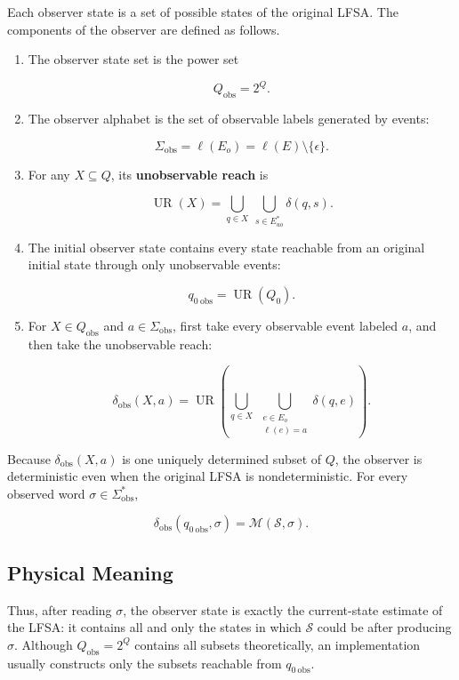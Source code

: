 \documentclass[11pt]{article}
\begin{document}
Each observer state is a set of possible states of the original LFSA. The components of the observer are defined as follows.

\begin{enumerate}
\item The observer state set is the power set

\[
   Q_{\mathrm{obs}}=2^Q.
\]

\item The observer alphabet is the set of observable labels generated by events:

\[
   \Sigma_{\mathrm{obs}}
   =\ell(E_o)
   =\ell(E)\setminus\{\epsilon\}.
\]

\item For any $X\subseteq Q$, its \textbf{unobservable reach} is

\[
   \operatorname{UR}(X)
   =\bigcup_{q\in X}\ \bigcup_{s\in E_{uo}^*}\delta(q,s).
\]

\item The initial observer state contains every state reachable from an original initial state through only unobservable events:

\[
   q_{0\ \mathrm{obs}}
   =\operatorname{UR}(Q_0).
\]

\item For $X\in Q_{\mathrm{obs}}$ and $a\in\Sigma_{\mathrm{obs}}$, first take every observable event labeled $a$, and then take the unobservable reach:

\[
   \delta_{\mathrm{obs}}(X,a)
   =
   \operatorname{UR}\left(
   \bigcup_{q\in X}
   \ \bigcup_{\substack{e\in E_o\\\ell(e)=a}}
   \delta(q,e)
   \right).
\]

\end{enumerate}

Because $\delta_{\mathrm{obs}}(X,a)$ is one uniquely determined subset of $Q$, the observer is deterministic even when the original LFSA is nondeterministic. For every observed word $\sigma\in\Sigma_{\mathrm{obs}}^*$,

\[
\delta_{\mathrm{obs}}(q_{0\ \mathrm{obs}},\sigma)
=\mathcal M(\mathcal S,\sigma).
\]

\subsection{Physical Meaning}

Thus, after reading $\sigma$, the observer state is exactly the current-state estimate of the LFSA: it contains all and only the states in which $\mathcal S$ could be after producing $\sigma$. Although $Q_{\mathrm{obs}}=2^Q$ contains all subsets theoretically, an implementation usually constructs only the subsets reachable from $q_{0\ \mathrm{obs}}$.
\end{document}

